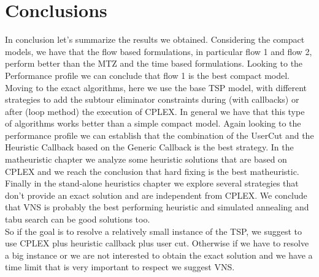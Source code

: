 \chapter{Conclusions}
In conclusion let's summarize the results we obtained. Considering the compact models, we have that the flow based formulations, in particular flow 1 and flow 2, perform better than the MTZ and the time based formulations. Looking to the Performance profile we can conclude that flow 1 is the best compact model.
Moving to the exact algorithms, here we use the base TSP model, with different strategies to add the subtour eliminator constraints during (with callbacks) or after (loop method) the execution of CPLEX. In general we have that this type of algorithms works better than a simple compact model. Again looking to the performance profile we can establish that the combination of the UserCut and the Heuristic Callback based on the Generic Callback is the best strategy.
In the matheuristic chapter we analyze some heuristic solutions that are based on CPLEX and we reach the conclusion that hard fixing is the best matheuristic.
Finally in the stand-alone heuristics chapter we explore several strategies that don't provide an exact solution and are independent from CPLEX. We conclude that VNS is probably the best performing heuristic and simulated annealing and tabu search can be good solutions too. \\

\noindent So if the goal is to resolve a relatively small instance of the TSP, we suggest to use CPLEX plus heuristic callback plus user cut. Otherwise if we have to resolve a big instance or we are not interested to obtain the exact solution and we have a time limit that is very important to respect we suggest VNS. 




